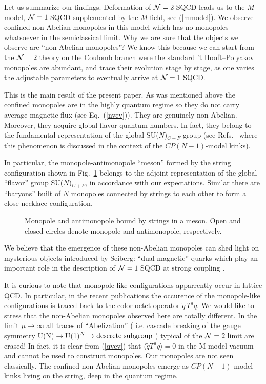 \documentclass[epsfig,12pt]{article}
\newcommand{\ntwo}{${\cal N}=2\;$}
\newcommand{\none}{${\cal N}=1\;$}
\begin{document}
Let us summarize our findings. Deformation of \ntwo SQCD
leads us to the $M$ model, \none SQCD supplemented by the $M$ field, see  
(\ref{mmodel}).
We observe confined non-Abelian monopoles in this model which  has no monopoles 
whatsoever in the semiclassical limit.
Why we are sure that the objects we observe are ``non-Abelian monopoles"?
We know this because we can start from the \ntwo theory on the Coulomb branch
were the standard 't Hooft--Polyakov monopoles are abundant,
and trace their evolution stage by stage, as one varies the adjustable parameters to eventually arrive at \none SQCD.

This is the main result of the present paper.
As was mentioned above
the  confined monopoles are in the highly quantum regime so they do not
carry average magnetic flux (see Eq.~(\ref{nvev})). They are genuinely non-Abelian.
Moreover, they acquire global flavor quantum numbers. In fact, they
belong to the fundamental representation of the global SU($N$)$_{C+F}$ group 
(see Refs.~\cite{W79,HoVa}
where this phenomenon
is discussed in the context of the $CP(N-1)$-model kinks).

 In particular, the  
monopole-antimonopole ``meson'' formed by the string configuration shown in 
Fig.~\ref{figmmeson} belongs to the adjoint representation of the global ``flavor''
group SU($N$)$_{C+F}$, in accordance with our expectations. Similar there are 
 ``baryons'' built of  $N$ monopoles connected by strings to each other to form
a close necklace configuration.

\begin{figure}[h]
\epsfxsize=8cm
\centerline{}
\caption{\footnotesize
Monopole and antimonopole bound by strings in a meson. Open  and closed
circles denote monopole and antimonopole, respectively. }
\label{figmmeson}
\end{figure}

We believe that
the emergence of these non-Abelian monopoles can 
shed light on mysterious objects introduced by Seiberg: ``dual magnetic''
quarks which play an important role in the description of \none SQCD at strong 
coupling \cite{Sdual,IS}.

It is curious to  note that  monopole-like
configurations apparrently occur in lattice
 QCD. In particular, in the recent publications \cite{Ch} the occurence of the 
monopole-like configurations is traced back to the color-octet operator
 $\tilde{q}\,T^a q$. We would like to
stress that the non-Abelian monopoles observed here are totally different. In the limit
$\mu\to \infty$ all traces of ``Abelization''  ( i.e. cascade
breaking of the gauge symmetry U(N)$\to$U(1)$^{N} \to {\rm descrete\; subgroup}$ )
typical of 
  the \ntwo limit  are erased! In fact, it is clear from (\ref{qvev})
that $\langle\tilde{q}T^a q\rangle=0$ in the   M-model vacuum  and cannot be used to 
construct monopoles.
Our monopoles are not seen classically. The confined non-Abelian monopoles emerge as
$CP(N-1)$-model kinks living on the  string, deep in the quantum regime.
\end{document}
